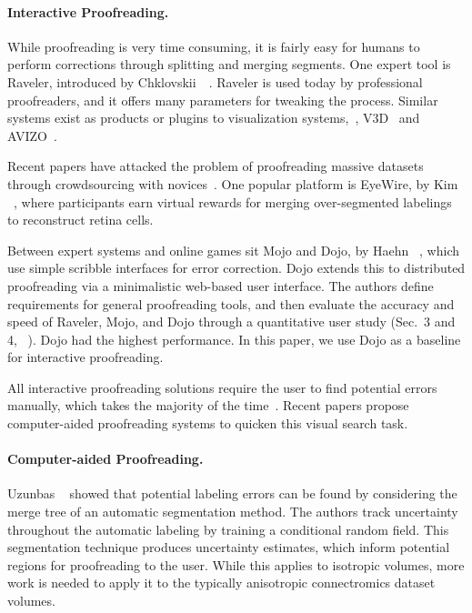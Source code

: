 \paragraph{Interactive Proofreading.} While proofreading is very time consuming, it is fairly easy for humans to perform corrections through splitting and merging segments. One expert tool is Raveler, introduced by Chklovskii~\etal~\cite{chklovskii2010, raveler}. Raveler is used today by professional proofreaders, and it offers many parameters for tweaking the process. Similar systems exist as products or plugins to visualization systems,~\eg, V3D~\cite{proofreading_bottleneck} and AVIZO~\cite{markus_proofreading}.

Recent papers have attacked the problem of proofreading massive datasets through crowdsourcing with novices~\cite{saalfeld09,anderson2011,Giuly2013DP2}. One popular platform is EyeWire, by Kim \etal~\cite{eyewire_nature}, where participants earn virtual rewards for merging over-segmented labelings to reconstruct retina cells.

Between expert systems and online games sit Mojo and Dojo, by Haehn
\etal~\cite{haehn_dojo_2014,Neuroblocks}, which use simple scribble interfaces
for error correction. Dojo extends this to distributed proofreading via a
minimalistic web-based user interface. The authors define requirements for
general proofreading tools, and then evaluate the accuracy and speed of Raveler,
Mojo, and Dojo through a quantitative user study (Sec.~3 and
4, ~\cite{haehn_dojo_2014}). Dojo had the highest performance. In this paper, we
use Dojo as a baseline for interactive proofreading.

All interactive proofreading solutions require the user to find potential errors manually, which takes the majority of the time~\cite{proofreading_bottleneck,haehn_dojo_2014}. Recent papers propose computer-aided proofreading systems to quicken this visual search task.

\paragraph{Computer-aided Proofreading.} Uzunbas \etal~\cite{uzunbas} showed that potential labeling errors can be found by considering the merge tree of an automatic segmentation method. The authors track uncertainty throughout the automatic labeling by training a conditional random field. This segmentation technique produces uncertainty estimates, which inform potential regions for proofreading to the user. While this applies to isotropic volumes, more work is needed to apply it to the typically anisotropic connectromics dataset volumes.

